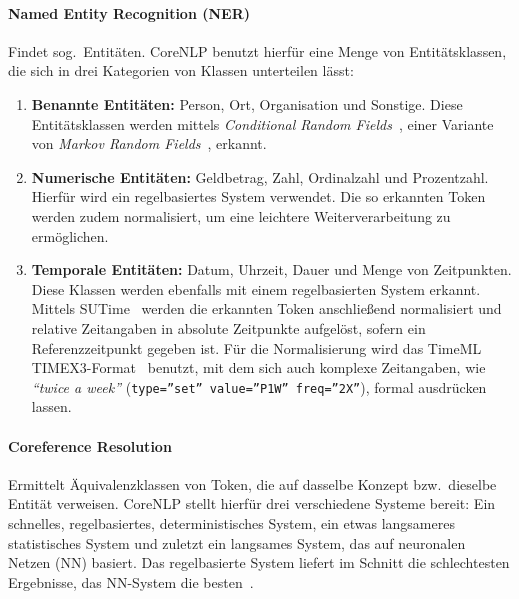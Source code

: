 \paragraph{Named Entity Recognition (NER)}
Findet sog.\ Entitäten.
CoreNLP benutzt hierfür eine Menge von Entitätsklassen, die sich in drei Kategorien von Klassen unterteilen lässt:
\begin{enumerate}
	\item \textbf{Benannte Entitäten:}
		Person, Ort, Organisation und Sonstige.
		Diese Entitätsklassen werden mittels \textit{Conditional Random Fields}~\cite{Finkel2005}, einer Variante von \textit{Markov Random Fields}~, erkannt.
	\item \textbf{Numerische Entitäten:}
		Geldbetrag, Zahl, Ordinalzahl und Prozentzahl.
		Hierfür wird ein regelbasiertes System verwendet.
		Die so erkannten Token werden zudem normalisiert, um eine leichtere Weiterverarbeitung zu ermöglichen.
	\item \textbf{Temporale Entitäten:}
		Datum, Uhrzeit, Dauer und Menge von Zeitpunkten.
		Diese Klassen werden ebenfalls mit einem regelbasierten System erkannt.
		Mittels SUTime~\cite{Chang2012} werden die erkannten Token anschließend normalisiert und relative Zeitangaben in absolute Zeitpunkte aufgelöst, sofern ein Referenzzeitpunkt gegeben ist.
		Für die Normalisierung wird das TimeML TIMEX3-Format~\cite{TIMEX3} benutzt, mit dem sich auch komplexe Zeitangaben, wie \textit{``twice a week''} (\texttt{type=''set'' value=''P1W'' freq=''2X''}), formal ausdrücken lassen.
\end{enumerate}

\paragraph{Coreference Resolution}
Ermittelt Äquivalenzklassen von Token, die auf dasselbe Konzept bzw.\ dieselbe Entität verweisen.
CoreNLP stellt hierfür drei verschiedene Systeme bereit:
Ein schnelles, regelbasiertes, deterministisches System, ein etwas langsameres statistisches System und zuletzt ein langsames System, das auf neuronalen Netzen (NN) basiert.
Das regelbasierte System liefert im Schnitt die schlechtesten Ergebnisse, das NN-System die besten~\cite{CoreNLPCoref}.

